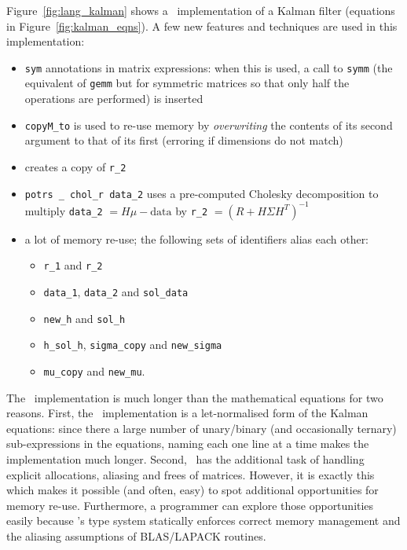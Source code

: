 Figure~\ref{fig:lang_kalman} shows a \lang\ implementation of a Kalman filter
(equations in Figure~\ref{fig:kalman_eqns}). A few new features and techniques
are used in this implementation:
\begin{itemize}

    \item \texttt{sym} annotations in matrix expressions: when this is used, a 
        call to \texttt{symm} (the equivalent of \texttt{gemm} but for
        symmetric matrices so that only half the operations are performed) is
        inserted

    \item \texttt{copyM\_to} is used to re-use memory by \emph{overwriting} the
        contents of its second argument to that of its first (erroring if
        dimensions do not match)

    \item {} creates a copy of \texttt{r\_2}

    \item \texttt{potrs \_ chol\_r data\_2} uses a pre-computed Cholesky decomposition
        to multiply \texttt{data\_2} $ = H \mu - \textrm{data}$ by
        \texttt{r\_2} $= (R + H \Sigma H^T)^{-1}$

    \item a lot of memory re-use; the following sets of identifiers alias each other:
        \begin{itemize}
            \item \texttt{r\_1} and \texttt{r\_2}
            \item \texttt{data\_1}, \texttt{data\_2} and \texttt{sol\_data}
            \item \texttt{new\_h} and \texttt{sol\_h}
            \item \texttt{h\_sol\_h}, \texttt{sigma\_copy} and \texttt{new\_sigma}
            \item \texttt{mu\_copy} and \texttt{new\_mu}.
        \end{itemize}

\end{itemize}

The \lang\ implementation is much longer than the mathematical equations for
two reasons. First, the \lang\ implementation is a let-normalised form of the
Kalman equations: since there a large number of unary/binary (and occasionally
ternary) sub-expressions in the equations, naming each one line at a time makes
the implementation much longer.  Second, \lang\ has the additional task of
handling explicit allocations, aliasing and frees of matrices. However, it is
exactly this which makes it possible (and often, easy) to spot additional
opportunities for memory re-use. Furthermore, a programmer can explore those
opportunities easily because \lang's type system statically enforces correct
memory management and the aliasing assumptions of BLAS/LAPACK routines.

